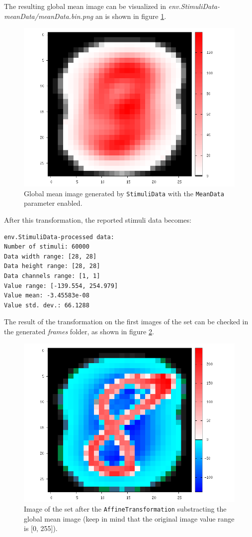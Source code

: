 \documentclass[a4paper,11pt,oneside]{article}
\begin{document}
The resulting global mean image can be visualized in
 \emph{env.StimuliData-meanData/meanData.bin.png} an is shown in figure
 \ref{fig:meanData}.

\begin{figure}[ht!]
  \centering
  \includegraphics[width=0.8\linewidth]{figs/meanData.png}
  \caption{Global mean image generated by \lstinline!StimuliData! with
  the \lstinline!MeanData! parameter enabled.}
  \label{fig:meanData}
\end{figure}

After this transformation, the reported stimuli data becomes:
\begin{lstlisting}[style=console]
env.StimuliData-processed data:
Number of stimuli: 60000
Data width range: [28, 28]
Data height range: [28, 28]
Data channels range: [1, 1]
Value range: [-139.554, 254.979]
Value mean: -3.45583e-08
Value std. dev.: 66.1288
\end{lstlisting}

The result of the transformation on the first images of the set can be checked
 in the generated \emph{frames} folder, as shown in figure
  \ref{fig:frameMinusMean}.

\begin{figure}[!htb]
  \centering
  \includegraphics[width=0.8\linewidth]{figs/frameMinusMean.png}
  \caption{Image of the set after the \lstinline!AffineTransformation!
  substracting the global mean image (keep in mind that the original image
  value range is [0, 255]).}
  \label{fig:frameMinusMean}
\end{figure}
\end{document}
